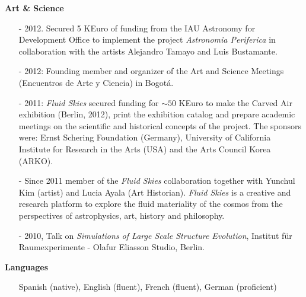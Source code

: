 \documentclass[9pt]{article}
\begin{document}
\newpage
{\bf Art \& Science}
\begin{itemize}
\item[-] 2012. Secured 5 KEuro of funding from the IAU Astronomy for Development Office to implement the project {\it Astronomia Periferica} in collaboration with the artists Alejandro Tamayo and Luis Bustamante.
\item [-] 2012: Founding member and organizer of the Art and Science Meetings (Encuentros de Arte y Ciencia) in Bogot\'a.
\item [-] 2011: {\it Fluid Skies} secured funding for $\sim 50$ KEuro to make the Carved Air exhibition (Berlin, 2012), print the exhibition catalog and prepare academic meetings on the scientific and historical concepts of the project. The sponsors were: Ernst Schering Foundation (Germany), University of California Institute for Research in the Arts (USA) and the Arts Council Korea (ARKO). 
\item [-] Since 2011 member of the {\it Fluid Skies} collaboration together with Yunchul Kim (artist) and Lucia Ayala (Art Historian). {\it Fluid Skies} is a creative and research platform to explore the fluid materiality of the cosmos from the perspectives of astrophysics, art, history and philosophy.
\item [-] 2010, Talk on {\it Simulations of Large Scale Structure Evolution}, Institut f\"ur Raumexperimente - Olafur Eliasson Studio, Berlin. 
\end{itemize}


{\bf Languages}
\begin{itemize}
\item[]Spanish (native), English (fluent), French (fluent), German (proficient)
\end{itemize}

\end{document}
